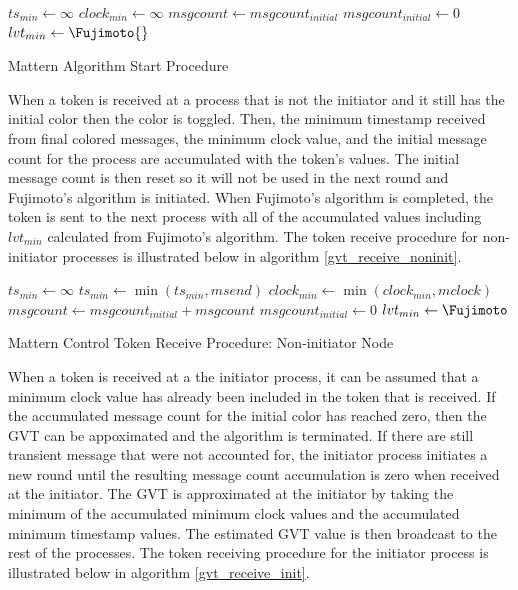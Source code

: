 \documentclass[11pt]{book}
\begin{document}
\begin{algorithm}
\DontPrintSemicolon
\SetAlgoVlined
{}
     
    $ts_{min} \gets \infty$\;
    $clock_{min} \gets \infty$
    $msgcount \gets msgcount_{initial}$\;
    $msgcount_{initial} \gets 0$\;
    $lvt_{min} \gets \Fujimoto{}$\;
    \;
\caption{Mattern Algorithm Start Procedure}\label{gvt_start}
\end{algorithm}

When a token is received at a process that is not the initiator and it still has the initial
color then the color is toggled. Then, the minimum timestamp received from final colored
messages, the minimum clock value, and the initial message count for the process are
accumulated with the token's values. The initial message count is then reset so it will not
be used in the next round and Fujimoto's algorithm is initiated. When Fujimoto's algorithm
is completed, the token is sent to the next process with all of the accumulated values
including $lvt_{min}$ calculated from Fujimoto's algorithm. The token receive procedure for
non-initiator processes is illustrated below in algorithm \ref{gvt_receive_noninit}.

\begin{algorithm}
\DontPrintSemicolon
\SetAlgoVlined
{}
     {
        $ts_{min} \gets \infty$\;
         
    }
    $ts_{min} \gets \min{(ts_{min}, msend)}$\;
    $clock_{min} \gets \min{(clock_{min}, mclock)}$\;
    $msgcount \gets msgcount_{initial} + msgcount$\;
    $msgcount_{initial} \gets 0$\;
    $lvt_{min} \gets \Fujimoto$\;
    \;
\caption{Mattern Control Token Receive Procedure: Non-initiator Node}\label{gvt_receive_noninit}
\end{algorithm}

When a token is received at a the initiator process, it can be assumed that a minimum clock
value has already been included in the token that is received. If the accumulated message count
for the initial color has reached zero, then the GVT can be appoximated and the algorithm
is terminated. If there are still transient message that were not accounted for, the initiator
process initiates a new round until the resulting message count accumulation is zero
when received at the initiator. The GVT is approximated at the initiator by taking the
minimum of the accumulated minimum clock values and the accumulated minimum timestamp values.
The estimated GVT value is then broadcast to the rest of the processes. The token receiving procedure
for the initiator process is illustrated below in algorithm \ref{gvt_receive_init}.
\end{document}
